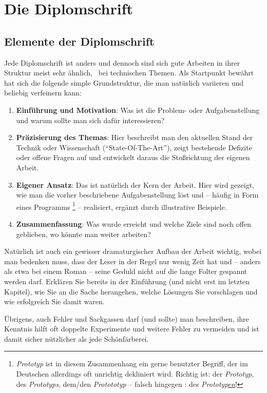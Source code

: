 \chapter{Die Diplomschrift}
\label{cha:Diplomschrift}



\section{Elemente der Diplomschrift}

Jede Diplomschrift ist anders und dennoch sind sich gute
Arbeiten in ihrer Struktur meist sehr ähnlich, \va\ bei
technischen Themen. Als Startpunkt bewährt hat sich die folgende
simple Grundstruktur, die man natürlich vari\-ieren und beliebig
verfeinern kann:
%
\begin{enumerate}
\item \textbf{Einführung und Motivation}: Was ist die Problem- oder Aufgabenstellung und
warum sollte man sich dafür interessieren?
\item \textbf{Präzisierung des Themas}: Hier beschreibt man den aktuellen Stand der Technik
oder Wissenschaft ("`State-Of-The-Art"'), zeigt bestehende
Defizite oder offene Fragen auf und entwickelt daraus die
Stoßrichtung der eigenen Arbeit.
\item \textbf{Eigener Ansatz}: Das ist natürlich der Kern der Arbeit. Hier
wird gezeigt, wie man die vorher beschriebene Aufgabenstellung löst und --
häufig in Form eines Programms%
\footnote{\emph{Prototyp} ist in diesem Zusammenhang ein gerne benutzter Begriff, der im Deutschen
allerdings oft unrichtig dekliniert wird. Richtig ist: der \emph{Prototyp}, des \emph{Prototyps}, dem/den \emph{Protototyp} -- falsch hingegen \zB: des \emph{Prototyp\underline{en}}!
} --
realisiert, ergänzt durch illustrative Beispiele.
\item \textbf{Zusammenfassung}: Was wurde erreicht und welche Ziele sind
noch offen geblieben, wo könnte man weiter arbeiten?
\end{enumerate}
%
Natürlich ist auch ein gewisser dramaturgischer Aufbau der Arbeit
wichtig, wobei man bedenken muss, dass der Leser in der Regel nur
wenig Zeit hat und -- anders als etwa bei einem Roman -- seine
Geduld nicht auf die lange Folter gespannt werden darf. Erklären
Sie bereits in der Einführung (und nicht erst im letzten Kapitel),
wie Sie an die Sache herangehen, welche Lösungen Sie vorschlagen
und wie erfolgreich Sie damit waren.

Übrigens, auch Fehler und Sackgassen darf (und sollte) man
beschreiben, ihre Kenntnis hilft oft doppelte Experimente und
weitere Fehler zu vermeiden und ist damit sicher nützlicher als
jede Schönfärberei.


